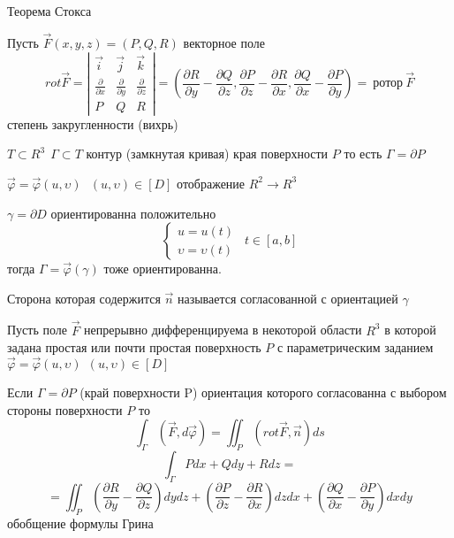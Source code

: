 \begin{title}[\Large]
  Теорема Стокса
\end{title}

\begin{define}
  Пусть $\vec F(x,y,z) = (P,Q,R)$ векторное поле
  $$
  rot \vec F =
  \left|
  \begin{array}{ccc}
    \vec i & \vec j & \vec k \\
    \frac{\partial}{\partial x} &
    \frac{\partial}{\partial y} &
    \frac{\partial}{\partial z} \\
    P & Q & R
  \end{array}
  \right| =
  \left(
    \frac{\partial R}{\partial y}
    -
    \frac{\partial Q}{\partial z},
    \frac{\partial P}{\partial z}
    -
    \frac{\partial R}{\partial x},
    \frac{\partial Q}{\partial x}
    -
    \frac{\partial P}{\partial y}
  \right) = ~ \text{ротор} ~ \vec F
  $$
  степень закругленности (вихрь)

  $T \subset R^3 ~~ \Gamma \subset T$ контур (замкнутая кривая) края
  поверхности $P$ то есть $\Gamma = \partial P$

  $\vec \varphi = \vec \varphi(u, \upsilon) ~~~ (u, \upsilon) \in [D]$
  отображение $R^2 \to R^3$

  $\gamma = \partial D$ ориентированна положительно
  $$
  \left\{
  \begin{array}{l}
    u = u(t) \\
    \upsilon = \upsilon(t)
  \end{array}
  \right. ~~ t \in [a,b]
  $$
  тогда $\Gamma = \vec \varphi(\gamma)$ тоже ориентированна.

  Сторона которая содержится $\vec n$ называется согласованной с ориентацией
  $\gamma$
\end{define}

\begin{theorem}[Стокса]
  Пусть поле $\vec F$ непрерывно дифференцируема в некоторой области $R^3$ в
  которой задана простая или почти простая поверхность $P$ с параметрическим
  заданием $\vec \varphi = \vec \varphi(u, \upsilon) ~~ (u, \upsilon) \in [D]$

  Если $\Gamma = \partial P$ (край поверхности P) ориентация которого
  согласованна с выбором стороны поверхности $P$ то
  $$
  \int_{\Gamma} (\vec F, d\vec \varphi) = \iint_P (rot \vec F, \vec n) ds
  $$
  $$
  \int_{\Gamma} Pdx + Qdy + Rdz =
  $$
  $$
  = \iint_P
  \left(
    \frac{\partial R}{\partial y}
    -
    \frac{\partial Q}{\partial z}
  \right) dy dz
  +
  \left(
    \frac{\partial P}{\partial z}
    -
    \frac{\partial R}{\partial x}
  \right) dz dx
  +
  \left(
    \frac{\partial Q}{\partial x}
    -
    \frac{\partial P}{\partial y}
  \right) dx dy
  $$
  обобщение формулы Грина
\end{theorem}

